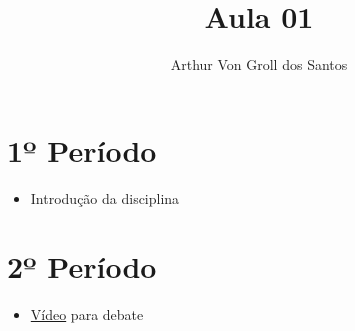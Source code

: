 \documentclass{article}
\author{Arthur Von Groll dos Santos}
\title{Aula 01}
\begin{document}
\maketitle

\section*{\centering 1º Período}
\begin{itemize}
    \item Introdução da disciplina
\end{itemize}

\section*{\centering 2º Período}

\begin{itemize}
    \item \href{https://www.youtube.com/watch?v=sXwQPiSgous}{Vídeo}  para debate
\end{itemize}
\end{document}
